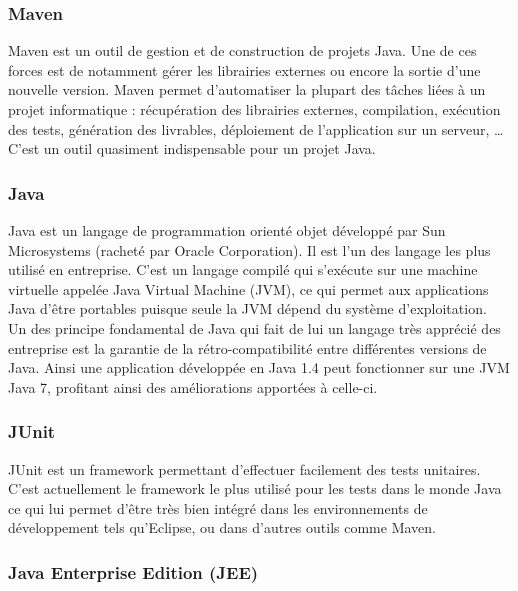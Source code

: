\subsubsection{Maven}

Maven \cite{maven} est un outil de gestion et de construction de projets Java. Une de ces forces est de notamment gérer les librairies externes ou encore la sortie d'une nouvelle version. Maven permet d'automatiser la plupart des tâches liées à un projet informatique : récupération des librairies externes, compilation, exécution des tests, génération des livrables, déploiement de l'application sur un serveur, \dots C'est un outil quasiment indispensable pour un projet Java.

\subsubsection{Java}

Java \cite{java} est un langage de programmation orienté objet développé par Sun Microsystems (racheté par Oracle Corporation). Il est l'un des langage les plus utilisé en entreprise. C'est un langage compilé qui s'exécute sur une machine virtuelle appelée Java Virtual Machine (JVM), ce qui permet aux applications Java d'être portables puisque seule la JVM dépend du système d'exploitation.\\

Un des principe fondamental de Java qui fait de lui un langage très apprécié des entreprise est la garantie de la rétro-compatibilité entre différentes versions de Java. Ainsi une application développée en Java 1.4 peut fonctionner sur une JVM Java 7, profitant ainsi des améliorations apportées à celle-ci.

\subsubsection{JUnit}

JUnit \cite{junit} est un framework permettant d'effectuer facilement des tests unitaires. C'est actuellement le framework le plus utilisé pour les tests dans le monde Java ce qui lui permet d'être très bien intégré dans les environnements de développement tels qu'Eclipse, ou dans d'autres outils comme Maven.

\subsubsection{Java Enterprise Edition (JEE)}

